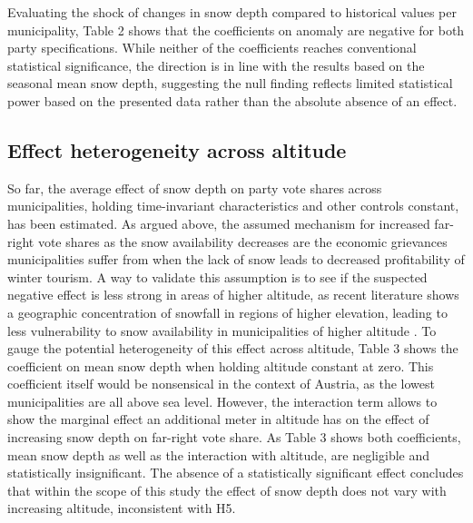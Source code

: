 \documentclass{article}
\begin{document}
Evaluating the shock of changes in snow depth compared to historical values per municipality, Table 2 shows that the coefficients on anomaly are negative for both party specifications. While neither of the coefficients reaches conventional statistical significance, the direction is in line with the results based on the seasonal mean snow depth, suggesting the null finding reflects limited statistical power based on the presented data rather than the absolute absence of an effect. 

\vspace{2em}
\begin{table}[H]
  \caption{\textit{Effect of Mean Snow Depth on Vote Shares}}
  \label{tab:mean}
  
\end{table}
\vspace{2em}


\begin{table}[H]
  \caption{\textit{Effect of Snow Anomaly on Vote Shares}}
  \label{tab:anomaly}
  
\end{table}
\newpage


\subsection{Effect heterogeneity across altitude}
So far, the average effect of snow depth on party vote shares across municipalities, holding time-invariant characteristics and other controls constant, has been estimated. As argued above, the assumed mechanism for increased  far-right vote shares as the snow availability decreases are the economic grievances  municipalities suffer from when the lack of snow leads to decreased profitability of winter tourism. A way to validate this assumption is to see if the suspected negative effect is less strong in areas of higher altitude, as recent literature shows a geographic concentration of snowfall in regions of higher elevation, leading to less vulnerability to snow availability in municipalities of higher altitude \parencite{li2025}. To gauge the potential heterogeneity of this effect across altitude, Table 3 shows the coefficient on mean snow depth when holding altitude constant at zero. This coefficient itself would be nonsensical in the context of Austria, as the lowest municipalities are all above sea level. However, the interaction term allows to show the marginal effect an additional meter in altitude has on the effect of increasing snow depth on far-right vote share. As Table 3 shows both coefficients, mean snow depth as well as the interaction with altitude, are negligible and statistically insignificant. The absence of a statistically significant effect concludes that within the scope of this study the effect of snow depth does not vary with increasing altitude, inconsistent with H5. 
\end{document}
